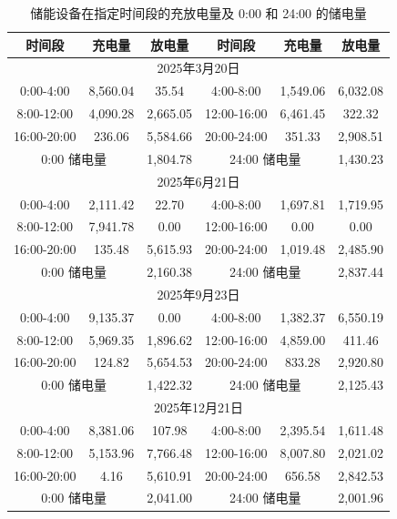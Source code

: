 \documentclass[withoutpreface,bwprint]{cumcmthesis}
\begin{document}
\begin{table}[h!]
	\centering
	\footnotesize
	\renewcommand{\arraystretch}{1.2}
	\setlength{\tabcolsep}{15pt}
	\caption{储能设备在指定时间段的充放电量及 0:00 和 24:00 的储电量}
	\label{tab:q3_spec_2}
	\begin{tabular}{|c|c|c|c|c|c|}
		\hline
		时间段 & 充电量 & 放电量 & 时间段 & 充电量 & 放电量 \\ \hline
		\multicolumn{6}{|c|}{2025年3月20日} \\ \hline
		0:00-4:00 & 8,560.04 & 35.54 & 4:00-8:00 & 1,549.06 & 6,032.08 \\ \hline
		8:00-12:00 & 4,090.28 & 2,665.05 & 12:00-16:00 & 6,461.45 & 322.32 \\ \hline
		16:00-20:00 & 236.06 & 5,584.66 & 20:00-24:00 & 351.33 & 2,908.51 \\ \hline
		\multicolumn{2}{|c|}{0:00 储电量} & 1,804.78 & \multicolumn{2}{c|}{24:00 储电量} & 1,430.23 \\ \hline
		\multicolumn{6}{|c|}{2025年6月21日} \\ \hline
		0:00-4:00 & 2,111.42 & 22.70 & 4:00-8:00 & 1,697.81 & 1,719.95 \\ \hline
		8:00-12:00 & 7,941.78 & 0.00 & 12:00-16:00 & 0.00 & 0.00 \\ \hline
		16:00-20:00 & 135.48 & 5,615.93 & 20:00-24:00 & 1,019.48 & 2,485.90 \\ \hline
		\multicolumn{2}{|c|}{0:00 储电量} & 2,160.38 & \multicolumn{2}{c|}{24:00 储电量} & 2,837.44 \\ \hline
		\multicolumn{6}{|c|}{2025年9月23日} \\ \hline
		0:00-4:00 & 9,135.37 & 0.00 & 4:00-8:00 & 1,382.37 & 6,550.19 \\ \hline
		8:00-12:00 & 5,969.35 & 1,896.62 & 12:00-16:00 & 4,859.00 & 411.46 \\ \hline
		16:00-20:00 & 124.82 & 5,654.53 & 20:00-24:00 & 833.28 & 2,920.80 \\ \hline
		\multicolumn{2}{|c|}{0:00 储电量} & 1,422.32 & \multicolumn{2}{c|}{24:00 储电量} & 2,125.43 \\ \hline
		\multicolumn{6}{|c|}{2025年12月21日} \\ \hline
		0:00-4:00 & 8,381.06 & 107.98 & 4:00-8:00 & 2,395.54 & 1,611.48 \\ \hline
		8:00-12:00 & 5,153.96 & 7,766.48 & 12:00-16:00 & 8,007.80 & 2,021.02 \\ \hline
		16:00-20:00 & 4.16 & 5,610.91 & 20:00-24:00 & 656.58 & 2,842.53 \\ \hline
		\multicolumn{2}{|c|}{0:00 储电量} & 2,041.00 & \multicolumn{2}{c|}{24:00 储电量} & 2,001.96 \\ \hline
	\end{tabular}
\end{table}
\end{document}
